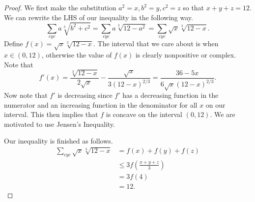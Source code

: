 \documentclass[letterpaper,oneside]{scrartcl}
\begin{document}
\begin{proof}
  We first make the substitution \(a^2=x,b^2=y,c^2=z\) so that \(x+y+z=12\). We can rewrite the LHS of our inequality in the following way.
  \[
    \sum_{cyc}a\sqrt[3]{b^2+c^2} 
    = \sum_{cyc}a\sqrt[3]{12-a^2}
    = \sum_{cyc}\sqrt{x}\sqrt[3]{12-x}.
  \]
  Define \(f(x) = \sqrt{x}\sqrt[3]{12-x}.\) The interval that we care about is when \(x \in (0,12)\), otherwise the value of \(f(x)\) is clearly nonpositive or complex. Note that
  \[f'(x) = \frac{\sqrt[3]{12-x}}{2\sqrt{x}} - \frac{\sqrt{x}}{3\left(12-x\right)^{2/3}} = \frac{36-5x}{6\sqrt{x}\left(12-x\right)^{2/3}}.\]Now note that \(f'\) is decreasing since \(f'\) has a decreasing function in the numerator and an increasing function in the denominator for all \(x\) on our interval. This then implies that \(f\) is concave on the interval \((0,12)\). We are motivated to use Jensen's Inequality.

  Our inequality is finished as follows.
  \begin{align*}
    \sum_{cyc}\sqrt{x}\sqrt[3]{12-x} & = f(x)+f(y)+f(z)                    \\
                                     & \leq 3f\left(\frac{x+y+z}{3}\right) \\
                                     & = 3f(4)                             \\
                                     & = 12.
  \end{align*}
\end{proof}
\end{document}
